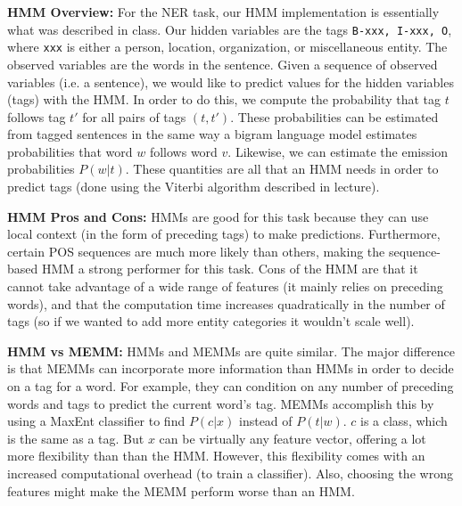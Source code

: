 \documentclass[12pt]{article}
\begin{document}
\maketitle
\textbf{HMM Overview:}
For the NER task, our HMM implementation is essentially what was described in class. Our hidden variables are the tags {\tt B-xxx, I-xxx, O}, where {\tt xxx} is either a person, location, organization, or miscellaneous entity. The observed variables are the words in the sentence. Given a sequence of observed variables (i.e. a sentence), we would like to predict values for the hidden variables (tags) with the HMM. In order to do this, we compute the probability that tag $t$ follows tag $t'$ for all pairs of tags $(t, t')$. These probabilities can be estimated from tagged sentences in the same way a bigram language model estimates probabilities that word $w$ follows word $v$. Likewise, we can estimate the emission probabilities $P(w|t)$. These quantities are all that an HMM needs in order to predict tags (done using the Viterbi algorithm described in lecture). 

\textbf{HMM Pros and Cons:} HMMs are good for this task because they can use local context (in the form of preceding tags) to make predictions. Furthermore, certain POS sequences are much more likely than others, making the sequence-based HMM a strong performer for this task. Cons of the HMM are that it cannot take advantage of a wide range of features (it mainly relies on preceding words), and that the computation time increases quadratically in the number of tags (so if we wanted to add more entity categories it wouldn't scale well).   

\textbf{HMM vs MEMM:} HMMs and MEMMs are quite similar. The major difference is that MEMMs can incorporate more information than HMMs in order to decide on a tag for a word. For example, they can condition on any number of preceding words and tags to predict the current word's tag. MEMMs accomplish this by using a MaxEnt classifier to find $P(c|x)$ instead of $P(t|w)$. $c$ is a class, which is the same as a tag. But $x$ can be virtually any feature vector, offering a lot more flexibility than than the HMM. However, this flexibility comes with an increased computational overhead (to train a classifier). Also, choosing the wrong features might make the MEMM perform worse than an HMM.   
\end{document}

